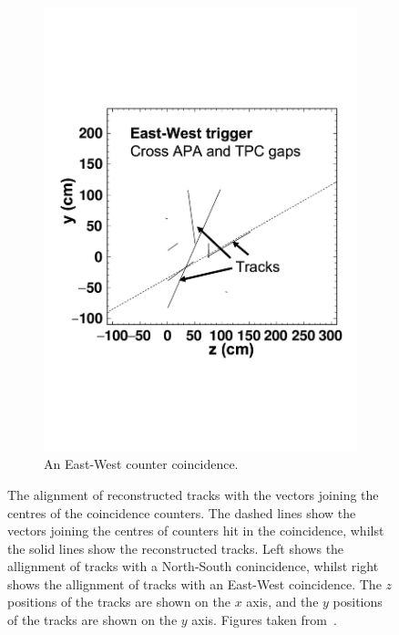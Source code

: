 \begin{figure}[h!]
\begin{subfigure}{0.48\textwidth}
    \includegraphics[width=\textwidth]{East-West}
    \caption{An East-West counter coincidence.}
  \end{subfigure}
  \caption[The alignment of reconstructed tracks with the vectors joining the centres of the coincidence counters]
          {The alignment of reconstructed tracks with the vectors joining the centres of the coincidence counters. The dashed lines show the vectors joining the centres of counters hit in the coincidence, whilst the solid lines show the reconstructed tracks. Left shows the allignment of tracks with a North-South conincidence, whilst right shows the allignment of tracks with an East-West coincidence. The $z$ positions of the tracks are shown on the $x$ axis, and the $y$ positions of the tracks are shown on the $y$ axis. Figures taken from~\citep{TingjunClustering}.}
          \label{fig:CounterTrackAngle}
\end{figure}

